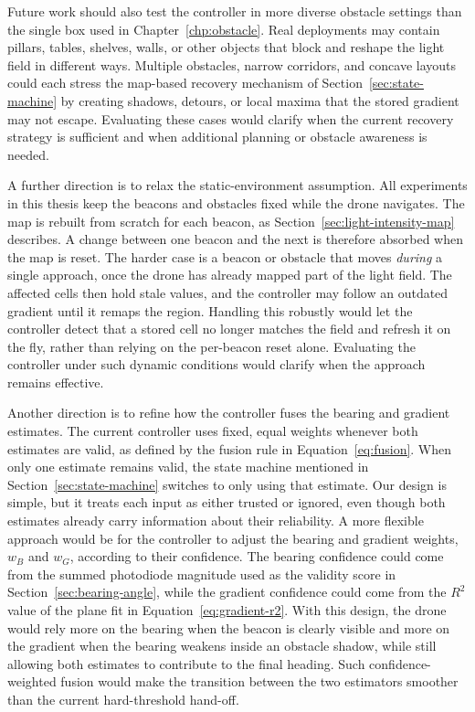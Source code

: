 Future work should also test the controller in more diverse obstacle settings than the single box used in Chapter~\ref{chp:obstacle}. Real deployments may contain pillars, tables, shelves, walls, or other objects that block and reshape the light field in different ways. Multiple obstacles, narrow corridors, and concave layouts could each stress the map-based recovery mechanism of Section~\ref{sec:state-machine} by creating shadows, detours, or local maxima that the stored gradient may not escape. Evaluating these cases would clarify when the current recovery strategy is sufficient and when additional planning or obstacle awareness is needed.

A further direction is to relax the static-environment assumption. All experiments in this thesis keep the beacons and obstacles fixed while the drone navigates. The map is rebuilt from scratch for each beacon, as Section~\ref{sec:light-intensity-map} describes. A change between one beacon and the next is therefore absorbed when the map is reset. The harder case is a beacon or obstacle that moves \emph{during} a single approach, once the drone has already mapped part of the light field. The affected cells then hold stale values, and the controller may follow an outdated gradient until it remaps the region. Handling this robustly would let the controller detect that a stored cell no longer matches the field and refresh it on the fly, rather than relying on the per-beacon reset alone. Evaluating the controller under such dynamic conditions would clarify when the approach remains effective.

Another direction is to refine how the controller fuses the bearing and gradient estimates. The current controller uses fixed, equal weights whenever both estimates are valid, as defined by the fusion rule in Equation~\ref{eq:fusion}. When only one estimate remains valid, the state machine mentioned in Section~\ref{sec:state-machine} switches to only using that estimate. Our design is simple, but it treats each input as either trusted or ignored, even though both estimates already carry information about their reliability. A more flexible approach would be for the controller to adjust the bearing and gradient weights, $w_B$ and $w_G$, according to their confidence. The bearing confidence could come from the summed photodiode magnitude used as the validity score in Section~\ref{sec:bearing-angle}, while the gradient confidence could come from the $R^2$ value of the plane fit in Equation~\ref{eq:gradient-r2}. With this design, the drone would rely more on the bearing when the beacon is clearly visible and more on the gradient when the bearing weakens inside an obstacle shadow, while still allowing both estimates to contribute to the final heading. Such confidence-weighted fusion would make the transition between the two estimators smoother than the current hard-threshold hand-off.


